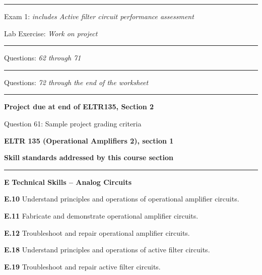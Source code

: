 \vskip 10pt
\hrule \vskip 5pt
\noindent
{}

\hskip 10pt Exam 1: {\it includes Active filter circuit performance assessment}
  
\hskip 10pt Lab Exercise: {\it Work on project}
 
\vskip 10pt
\hrule \vskip 5pt
\noindent
{}

\hskip 10pt Questions: {\it 62 through 71}
 
\vskip 10pt
\hrule \vskip 5pt
\noindent
{}

\hskip 10pt Questions: {\it 72 through the end of the worksheet}
 
\vskip 10pt
\hrule \vskip 5pt
\noindent
{}

\hskip 10pt {\bf Project due at end of ELTR135, Section 2}
 
\hskip 10pt Question 61: Sample project grading criteria
 
\vskip 10pt







\vfil \eject

\centerline{\bf ELTR 135 (Operational Amplifiers 2), section 1} \bigskip 
 
\vskip 10pt

\noindent
{\bf Skill standards addressed by this course section}

\vskip 5pt

\hrule \vskip 10pt
\noindent
{}

\vskip 5pt

\medskip
\item{\bf E} {\bf Technical Skills -- Analog Circuits}
\item{\bf E.10} Understand principles and operations of operational amplifier circuits.
\item{\bf E.11} Fabricate and demonstrate operational amplifier circuits.
\item{\bf E.12} Troubleshoot and repair operational amplifier circuits.
\item{\bf E.18} Understand principles and operations of active filter circuits.
\item{\bf E.19} Troubleshoot and repair active filter circuits.
\medskip

